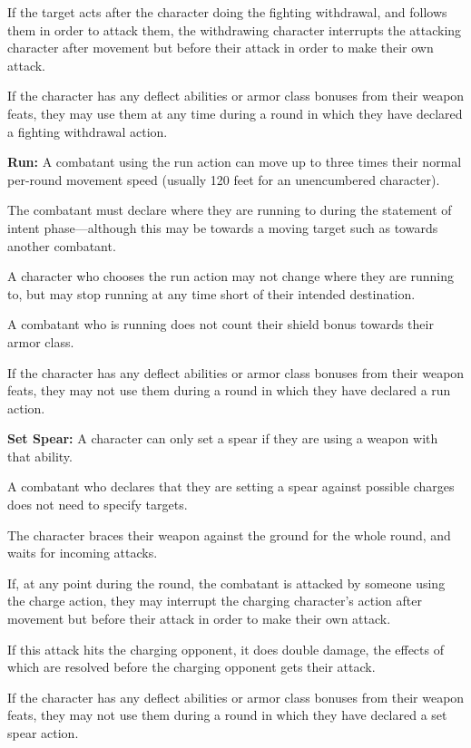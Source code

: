 \begin{multicols*}{2}
If the target acts after the character doing the fighting withdrawal, and follows them in order to attack them, the withdrawing character interrupts the attacking character after movement but before their attack in order to make their own attack.

If the character has any deflect abilities or armor class bonuses from their weapon feats, they may use them at any time during a round in which they have declared a fighting withdrawal action.

\textbf{Run:} A combatant using the run action can move up to three times their normal per-round movement speed (usually 120 feet for an unencumbered character).

The combatant must declare where they are running to during the statement of intent phase—although this may be towards a moving target such as towards another combatant.

A character who chooses the run action may not change where they are running to, but may stop running at any time short of their intended destination.

A combatant who is running does not count their shield bonus towards their armor class.

If the character has any deflect abilities or armor class bonuses from their weapon feats, they may not use them during a round in which they have declared a run action.

\textbf{Set Spear:}\label{sec:Set Spear} A character can only set a spear if they are using a weapon with that ability.

A combatant who declares that they are setting a spear against possible charges does not need to specify targets.

The character braces their weapon against the ground for the whole round, and waits for incoming attacks.

If, at any point during the round, the combatant is attacked by someone using the charge action, they may interrupt the charging character’s action after movement but before their attack in order to make their own attack.

If this attack hits the charging opponent, it does double damage, the effects of which are resolved before the charging opponent gets their attack.

If the character has any deflect abilities or armor class bonuses from their weapon feats, they may not use them during a round in which they have declared a set spear action.


\end{multicols*}
